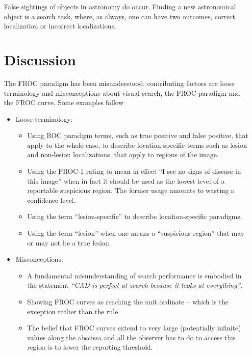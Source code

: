 \documentclass[
]{book}
\providecommand{\tightlist}{%
  \setlength{\itemsep}{0pt}\setlength{\parskip}{0pt}}
\begin{document}
False sightings of objects in astronomy do occur. Finding a new astronomical object is a search task, where, as always, one can have two outcomes, correct localization or incorrect localizations.

\hypertarget{froc-paradigm-discussion}{%
\section{Discussion}\label{froc-paradigm-discussion}}

The FROC paradigm has been misunderstood: contributing factors are loose terminology and misconceptions about visual search, the FROC paradigm and the FROC curve. Some examples follow

\begin{itemize}
\tightlist
\item
  Loose terminology:

  \begin{itemize}
  \tightlist
  \item
    Using ROC paradigm terms, such as true positive and false positive, that apply to the whole case, to describe location-specific terms such as lesion and non-lesion localizations, that apply to regions of the image.\\
  \item
    Using the FROC-1 rating to mean in effect ``I see no signs of disease in this image'' when in fact it should be used as the lowest level of a reportable suspicious region. The former usage amounts to wasting a confidence level.
  \item
    Using the term ``lesion-specific'' to describe location-specific paradigms.
  \item
    Using the term ``lesion'' when one means a ``suspicious region'' that may or may not be a true lesion.
  \end{itemize}
\item
  Misconceptions:

  \begin{itemize}
  \tightlist
  \item
    A fundamental misunderstanding of search performance is embodied in the statement \emph{``CAD is perfect at search because it looks at everything''}.
  \item
    Showing FROC curves as reaching the unit ordinate -- which is the exception rather than the rule.
  \item
    The belief that FROC curves extend to very large (potentially infinite) values along the abscissa and all the observer has to do to access this region is to lower the reporting threshold.
  \end{itemize}
\end{itemize}
\end{document}
